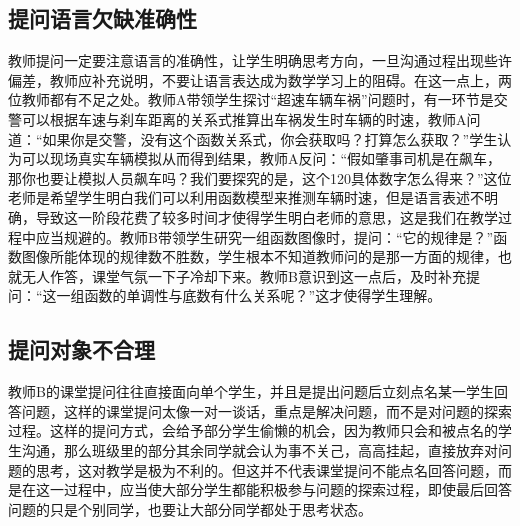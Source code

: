 \subsection{提问语言欠缺准确性}

教师提问一定要注意语言的准确性，让学生明确思考方向，一旦沟通过程出现些许偏差，教师应补充说明，不要让语言表达成为数学学习上的阻碍。在这一点上，两位教师都有不足之处。教师A带领学生探讨“超速车辆车祸”问题时，有一环节是交警可以根据车速与刹车距离的关系式推算出车祸发生时车辆的时速，教师A问道：“如果你是交警，没有这个函数关系式，你会获取吗？打算怎么获取？”学生认为可以现场真实车辆模拟从而得到结果，教师A反问：“假如肇事司机是在飙车，那你也要让模拟人员飙车吗？我们要探究的是，这个120具体数字怎么得来？”这位老师是希望学生明白我们可以利用函数模型来推测车辆时速，但是语言表述不明确，导致这一阶段花费了较多时间才使得学生明白老师的意思，这是我们在教学过程中应当规避的。教师B带领学生研究一组函数图像时，提问：“它的规律是？”函数图像所能体现的规律数不胜数，学生根本不知道教师问的是那一方面的规律，也就无人作答，课堂气氛一下子冷却下来。教师B意识到这一点后，及时补充提问：“这一组函数的单调性与底数有什么关系呢？”这才使得学生理解。


\subsection{提问对象不合理}

教师B的课堂提问往往直接面向单个学生，并且是提出问题后立刻点名某一学生回答问题，这样的课堂提问太像一对一谈话，重点是解决问题，而不是对问题的探索过程。这样的提问方式，会给予部分学生偷懒的机会，因为教师只会和被点名的学生沟通，那么班级里的部分其余同学就会认为事不关己，高高挂起，直接放弃对问题的思考，这对教学是极为不利的。但这并不代表课堂提问不能点名回答问题，而是在这一过程中，应当使大部分学生都能积极参与问题的探索过程，即使最后回答问题的只是个别同学，也要让大部分同学都处于思考状态。
